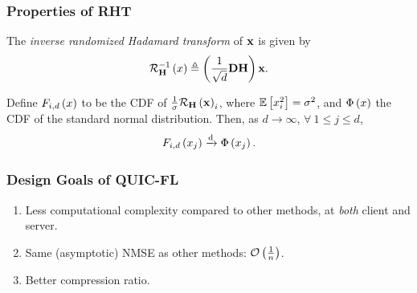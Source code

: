 \documentclass{beamer}
\begin{document}
    \begin{frame}
        \frametitle{Properties of RHT}
        \begin{definition}
            The \emph{inverse randomized Hadamard transform} of \(\boldsymbol{\mathbf{x}}\) is given by
            \begin{equation}
                \mathcal R_{\boldsymbol{\mathbf{H}}}^{-1}\left(x\right) \triangleq \left(\frac{1}{\sqrt{d}}\boldsymbol{\mathbf{DH}}\right)\boldsymbol{\mathbf{x}}.
                \label{eq:inv-rht-def}
            \end{equation}
        \end{definition}
        \begin{lemma}
            \label{lem:rht-norm-conv}
            Define \(F_{i,d}\left(x\right)\) to be the CDF of
            \(\frac{1}{\sigma}\mathcal R_{\boldsymbol{\mathbf{H}}}\left(\boldsymbol{\mathbf{x}}\right)_i\), where
            \(\mathbb{E}\left[ x_i^2 \right] = \sigma^2\), and \(\Phi\left(x\right)\) the CDF of the
            standard normal distribution. Then, as \(d\to\infty\), \(\forall\ 1
            \le j \le d\), 
            \begin{equation}
                F_{i,d}\left(x_j\right) \xrightarrow{\mathrm{d}} \Phi\left(x_j\right).
                \label{eq:rht-norm-conv}
            \end{equation}
        \end{lemma}
    \end{frame}

    \begin{frame}
        \frametitle{Design Goals of QUIC-FL}
        \begin{enumerate}
            \item Less computational complexity compared to other methods, at
            \emph{both} client and server.
            \item Same (asymptotic) NMSE as other methods: \(\mathcal O\left(\frac{1}{n}\right)\).
            \item Better compression ratio.
        \end{enumerate}
    \end{frame}
\end{document}
